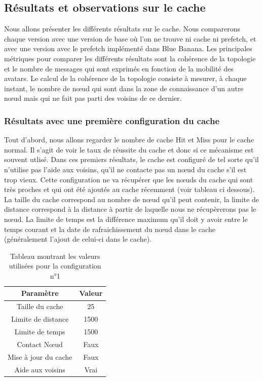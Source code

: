 \subsection{Résultats et observations sur le cache}
\label{resObsCache}

Nous allons présenter les différents résultats sur le cache. Nous comparerons chaque version avec une version de base où l'on ne trouve ni cache ni prefetch, et avec une version avec le prefetch implémenté dans Blue Banana.
Les principales métriques pour comparer les différents résultats sont la cohérence de la topologie et le nombre de messages qui sont exprimés en fonction de la mobilité des avatars. Le calcul de la cohérence de la topologie consiste à mesurer, à chaque instant, le nombre de nœud qui sont dans la zone de connaissance d'un autre nœud mais qui ne fait pas parti des voisins de ce dernier.

\subsubsection{Résultats avec une première configuration du cache}
\par Tout d'abord, nous allons regarder le nombre de cache Hit et Miss pour le cache normal. Il s'agit de voir le taux de réussite du cache et donc si ce mécanisme est souvent utlisé. Dans ces premiers résultats, le cache est configuré de tel sorte qu'il n'utilise pas l'aide aux voisins, qu'il ne contacte pas un nœud du cache s'il est trop vieux. Cette configuration ne va récupérer que les nœuds du cache qui sont très proches et qui ont été ajoutés au cache récemment (voir tableau ci dessous). La taille du cache correspond au nombre de nœud qu'il peut contenir, la limite de distance correspond à la distance à partir de laquelle nous ne récupèrerons pas le nœud. La limite de temps est la différence maximum qu'il doit y avoir entre le temps courant et la date de rafraichissement du nœud dans le cache (généralement l'ajout de celui-ci dans le cache). 
\begin{table}[!h]
  \begin{center}
    \begin{tabular}{|c|c|}
      \hline
      Paramètre & Valeur\\
      \hline
      Taille du cache & 25\\
      Limite de distance &  1500\\
      Limite de temps & 1500\\
      Contact Nœud & Faux\\
      Mise à jour du cache & Faux\\
      Aide aux voisins & Vrai\\
      \hline
    \end{tabular}
  \end{center}
  \label{tab:config1}
  \caption{Tableau montrant les valeurs utilisées pour la configuration n°1}
\end{table}


